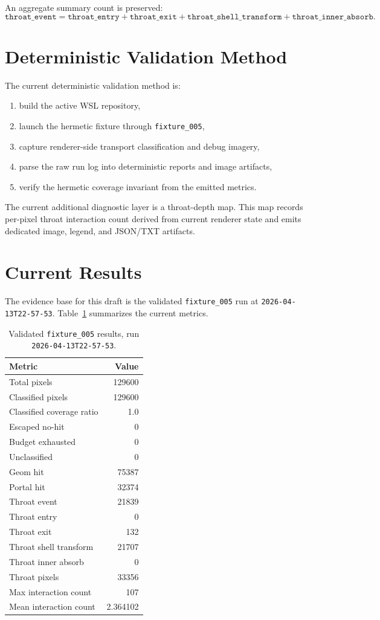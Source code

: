 \documentclass[11pt]{article}
\begin{document}
An aggregate summary count is preserved:
\[
\texttt{throat\_event} = \texttt{throat\_entry} + \texttt{throat\_exit} + \texttt{throat\_shell\_transform} + \texttt{throat\_inner\_absorb}.
\]

\section{Deterministic Validation Method}
The current deterministic validation method is:
\begin{enumerate}[leftmargin=1.5em]
\item build the active WSL repository,
\item launch the hermetic fixture through \texttt{fixture\_005},
\item capture renderer-side transport classification and debug imagery,
\item parse the raw run log into deterministic reports and image artifacts,
\item verify the hermetic coverage invariant from the emitted metrics.
\end{enumerate}

The current additional diagnostic layer is a throat-depth map. This map records per-pixel throat interaction count derived from current renderer state and emits dedicated image, legend, and JSON/TXT artifacts.

\section{Current Results}
The evidence base for this draft is the validated \texttt{fixture\_005} run at \texttt{2026-04-13T22-57-53}. Table~\ref{tab:results} summarizes the current metrics.

\begin{table}[h]
\centering
\begin{tabular}{lr}
\toprule
Metric & Value \\
\midrule
Total pixels & 129600 \\
Classified pixels & 129600 \\
Classified coverage ratio & 1.0 \\
Escaped no-hit & 0 \\
Budget exhausted & 0 \\
Unclassified & 0 \\
Geom hit & 75387 \\
Portal hit & 32374 \\
Throat event & 21839 \\
Throat entry & 0 \\
Throat exit & 132 \\
Throat shell transform & 21707 \\
Throat inner absorb & 0 \\
Throat pixels & 33356 \\
Max interaction count & 107 \\
Mean interaction count & 2.364102 \\
\bottomrule
\end{tabular}
\caption{Validated \texttt{fixture\_005} results, run \texttt{2026-04-13T22-57-53}.}
\label{tab:results}
\end{table}
\end{document}

